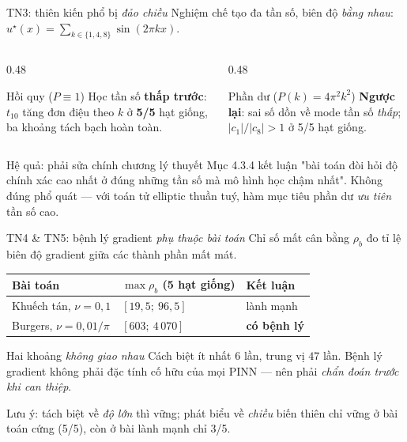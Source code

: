 \documentclass[aspectratio=169,11pt]{beamer}
\newcommand{\abs}[1]{\left\lvert #1 \right\rvert}
\newcommand{\good}[1]{\textcolor{good}{\textbf{#1}}}
\newcommand{\bad}[1]{\textcolor{bad}{\textbf{#1}}}
\begin{document}
\begin{frame}{TN3: thiên kiến phổ bị \emph{đảo chiều}}
Nghiệm chế tạo đa tần số, biên độ \emph{bằng nhau}:
$u^{\star}(x) = \sum_{k\in\{1,4,8\}}\sin(2\pi k x)$.

\medskip
\begin{columns}[T]
\begin{column}{0.48\textwidth}
\begin{block}{Hồi quy ($P \equiv 1$)}
Học tần số \good{thấp trước}: $t_{10}$ tăng đơn điệu theo $k$ ở \good{5/5} hạt giống,
ba khoảng tách bạch hoàn toàn.
\end{block}
\end{column}
\begin{column}{0.48\textwidth}
\begin{alertblock}{Phần dư ($P(k) = 4\pi^2k^2$)}
\bad{Ngược lại}: sai số dồn về mode tần số \emph{thấp};
$\abs{c_1}/\abs{c_8} > 1$ ở 5/5 hạt giống.
\end{alertblock}
\end{column}
\end{columns}

\medskip
\begin{block}{Hệ quả: phải sửa chính chương lý thuyết}
Mục 4.3.4 kết luận "bài toán đòi hỏi độ chính xác cao nhất ở đúng những tần số mà
mô hình học chậm nhất". \alert{Không đúng phổ quát} --- với toán tử elliptic thuần
tuý, hàm mục tiêu phần dư \emph{ưu tiên} tần số cao.
\end{block}
\end{frame}

\begin{frame}{TN4 \& TN5: bệnh lý gradient \emph{phụ thuộc bài toán}}
Chỉ số mất cân bằng $\rho_b$ đo tỉ lệ biên độ gradient giữa các thành phần mất mát.

\medskip
\begin{table}
\small
\begin{tabular}{@{}lll@{}}
\toprule
\textbf{Bài toán} & $\max\rho_b$ (5 hạt giống) & \textbf{Kết luận} \\
\midrule
Khuếch tán, $\nu = 0{,}1$ & $[19{,}5;\ 96{,}5]$   & lành mạnh \\
Burgers, $\nu = 0{,}01/\pi$ & $[603;\ 4\,070]$    & \bad{có bệnh lý} \\
\bottomrule
\end{tabular}
\end{table}

\medskip
\begin{alertblock}{Hai khoảng \emph{không giao nhau}}
Cách biệt ít nhất $6$ lần, trung vị $47$ lần.
Bệnh lý gradient \alert{không phải đặc tính cố hữu của mọi PINN} ---
nên phải \emph{chẩn đoán trước khi can thiệp}.
\end{alertblock}

\footnotesize
Lưu ý: tách biệt về \emph{độ lớn} thì vững; phát biểu về \emph{chiều} biến thiên
chỉ vững ở bài toán cứng (5/5), còn ở bài lành mạnh chỉ 3/5.
\end{frame}
\end{document}
